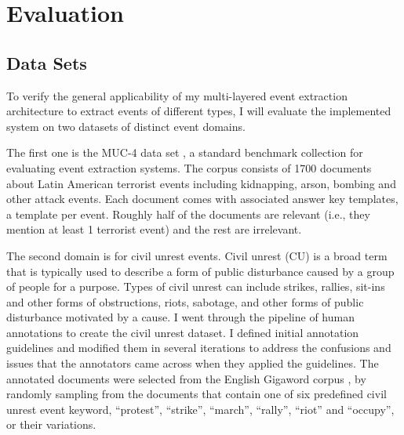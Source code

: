 \section{Evaluation}
\label{eval-section}


\subsection{Data Sets}
\label{TIER:creating-annotations}

To verify the general applicability of my multi-layered event extraction architecture 
to extract events of different types, I will evaluate the implemented system 
on two datasets of distinct event domains. 

The first one is 
the MUC-4 data set
\cite{muc4-proceedings}, 
a standard benchmark collection 
for evaluating event extraction systems. 
The corpus consists of 1700 documents about Latin American terrorist
events including kidnapping, arson, bombing and other attack events.
Each document comes with associated answer key templates, a template per event. 
Roughly half of the
documents are relevant (i.e., they mention
at least 1 terrorist event) and the rest are irrelevant.

The second domain is for civil unrest events. 
Civil unrest (CU) is a broad term that is typically used 
to describe a form of public disturbance caused by a
group of people for a purpose. 
Types of civil unrest can include 
strikes, rallies, sit-ins and other forms of obstructions, riots,
sabotage, and other forms of public disturbance motivated by a
cause. 
I 
went through the pipeline of human annotations to 
create the civil unrest dataset. 
I defined initial annotation guidelines and modified them 
in several iterations 
to address the confusions and issues that the annotators 
came across when they applied the guidelines. 
The annotated documents were 
selected from the  
English Gigaword corpus \cite{Gigaword}, by randomly 
sampling from the documents 
that contain one of six predefined civil unrest event keyword, 
``protest'',
``strike'', ``march'', ``rally'', ``riot'' and ``occupy'', 
or their variations. 


